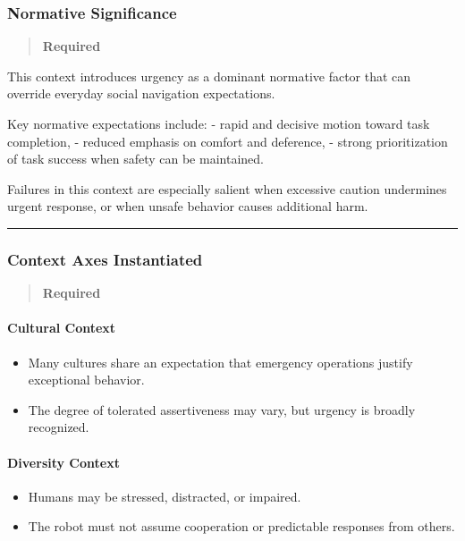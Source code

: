 \documentclass[utf8]{frontiers_suppmat} %
\providecommand{\tightlist}{%
  \setlength{\itemsep}{0pt}\setlength{\parskip}{0pt}}
\begin{document}
\subsubsection{Normative Significance}\label{normative-significance}

\begin{quote}
\textbf{Required}
\end{quote}

This context introduces urgency as a dominant normative factor that can
override everyday social navigation expectations.

Key normative expectations include: - rapid and decisive motion toward
task completion, - reduced emphasis on comfort and deference, - strong
prioritization of task success when safety can be maintained.

Failures in this context are especially salient when excessive caution
undermines urgent response, or when unsafe behavior causes additional
harm.

\begin{center}\rule{0.5\linewidth}{0.5pt}\end{center}

\subsubsection{Context Axes
Instantiated}\label{context-axes-instantiated}

\begin{quote}
\textbf{Required}
\end{quote}

\paragraph{Cultural Context}\label{cultural-context}

\begin{itemize}
\tightlist
\item
  Many cultures share an expectation that emergency operations justify
  exceptional behavior.
\item
  The degree of tolerated assertiveness may vary, but urgency is broadly
  recognized.
\end{itemize}

\paragraph{Diversity Context}\label{diversity-context}

\begin{itemize}
\tightlist
\item
  Humans may be stressed, distracted, or impaired.
\item
  The robot must not assume cooperation or predictable responses from
  others.
\end{itemize}
\end{document}
